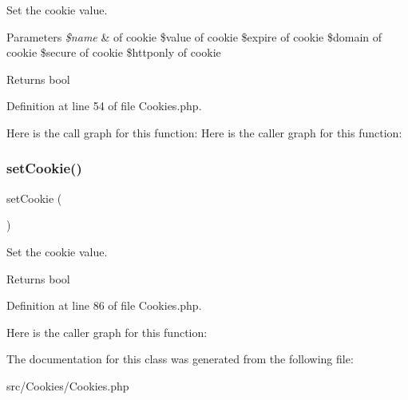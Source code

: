 Set the cookie value.


\begin{DoxyParams}{Parameters}
{\em \$name} & of cookie \$value of cookie \$expire of cookie \$domain of cookie \$secure of cookie \$httponly of cookie\\
\hline
\end{DoxyParams}
\begin{DoxyReturn}{Returns}
bool 
\end{DoxyReturn}


Definition at line 54 of file Cookies.\+php.

Here is the call graph for this function\+:
Here is the caller graph for this function\+:
\mbox{\label{class_zest_1_1_cookies_1_1_cookies_a46c656a0b18e88410d3067af69868a63}} 
\subsubsection{\texorpdfstring{set\+Cookie()}{setCookie()}}
{\footnotesize\ttfamily set\+Cookie (\begin{DoxyParamCaption}{ }\end{DoxyParamCaption})}

Set the cookie value.

\begin{DoxyReturn}{Returns}
bool 
\end{DoxyReturn}


Definition at line 86 of file Cookies.\+php.

Here is the caller graph for this function\+:


The documentation for this class was generated from the following file\+:\begin{DoxyCompactItemize}
\item 
src/\+Cookies/Cookies.\+php\end{DoxyCompactItemize}
